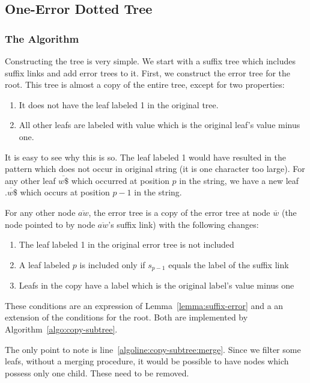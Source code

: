 \subsection{One-Error Dotted Tree}
\subsubsection{The Algorithm}

Constructing the tree is very simple. We start with a suffix tree which includes suffix links and add error trees to it. First, we construct the error tree for the root. This tree is almost a copy of the entire tree, except for two properties:

\begin{enumerate}
\item It does not have the leaf labeled 1 in the original tree.
\item All other leafs are labeled with value which is the original leaf's value minus one.
\end{enumerate}

It is easy to see why this is so. The leaf labeled 1 would have resulted in the pattern  which does not occur in original string (it is one character too large). For any other leaf $\overline{w\$}$ which occurred at position $p$ in the string, we have a new leaf $\overline{.w\$}$ which occurs at position $p-1$ in the string.

For any other node $\overline{aw}$, the error tree is a copy of the error tree at node $\overline{w}$ (the node pointed to by node $\overline{aw}$'s suffix link) with the following changes:

\begin{enumerate}
\item The leaf labeled 1 in the original error tree is not included
\item A leaf labeled $p$ is included only if $s_{p-1}$ equals the label of the suffix link
\item Leafs in the copy have a label which is the original label's value minus one
\end{enumerate}

These conditions are an expression of Lemma~\ref{lemma:suffix-error} and a an extension of the conditions for the root. Both are implemented by Algorithm~\ref{algo:copy-subtree}.

%
%
The only point to note is line~\ref{algoline:copy-subtree:merge}. Since we filter some leafs, without a merging procedure, it would be possible to have nodes which possess only one child. These need to be removed.

